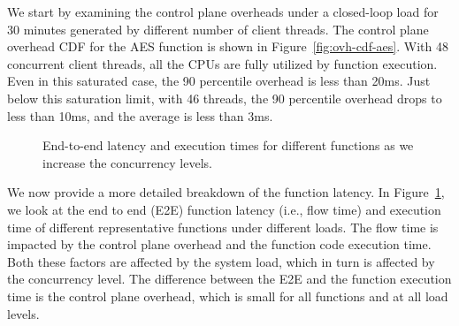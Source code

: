 We start by examining the control plane overheads under a closed-loop load for 30 minutes generated by different number of client threads. 
The control plane overhead CDF for the AES function is shown in Figure~\ref{fig:ovh-cdf-aes}. 
With 48 concurrent client threads, all the CPUs are fully utilized by function execution. 
Even in this saturated case, the 90 percentile overhead is less than 20ms. 
Just below this saturation limit, with 46 threads, the 90 percentile overhead drops to less than 10ms, and the average is less than 3ms. 


\begin{figure}
  \centering
      \caption[e2e-fn-all]{End-to-end latency and execution times for different functions as we increase the concurrency levels.}
  \label{fig:flow-fn-all}
\end{figure}

We now provide a more detailed breakdown of the function latency.  
In Figure~\ref{fig:flow-fn-all}, we look at the end to end (E2E) function latency (i.e., flow time) and execution time of different representative functions under different loads.
The flow time is impacted by the control plane overhead and the function code execution time. 
Both these factors are affected by the system load, which in turn is affected by the concurrency level.
The difference between the E2E and the function execution time is the control plane overhead, which is small for all functions and at all load levels.


